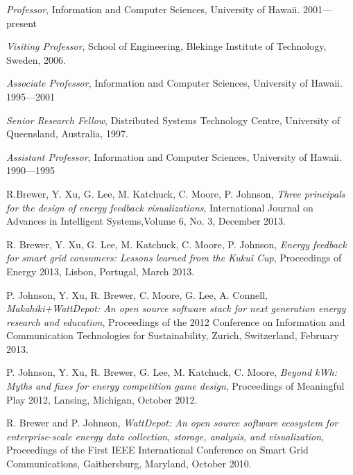 \begin{Appointments}
\item {\em Professor},  Information and Computer
  Sciences, University of Hawaii.  2001---present

\item {\em Visiting Professor}, School of Engineering, Blekinge Institute of Technology, Sweden, 2006.

\item {\em Associate Professor},  Information and Computer
  Sciences, University of Hawaii.  1995---2001

\item {\em Senior Research Fellow},  Distributed Systems Technology Centre,
University of Queensland, Australia, 1997.

\item {\em Assistant Professor},   Information and Computer
  Sciences, University of Hawaii.  1990---1995

\end{Appointments}




\begin{Publications: Closely Related}

\item R.Brewer, Y. Xu, G. Lee, M. Katchuck, C. Moore, P. Johnson, {\em Three principals for the design of energy feedback visualizations}, International Journal on Advances in Intelligent Systems,Volume 6, No. 3, December 2013.


\item R. Brewer, Y. Xu, G. Lee, M. Katchuck, C. Moore, P. Johnson, {\em Energy feedback for smart grid consumers: Lessons learned from the Kukui Cup}, Proceedings of Energy 2013, Lisbon, Portugal, March 2013.


\item P. Johnson, Y. Xu, R. Brewer,  C. Moore,  G. Lee, A. Connell, {\em Makahiki+WattDepot: An open source software stack for next generation energy research and education}, Proceedings of the 2012 Conference on Information and Communication Technologies for Sustainability, Zurich, Switzerland, February 2013.

\item P. Johnson, Y. Xu, R. Brewer, G. Lee, M. Katchuck, C. Moore, {\em Beyond kWh: Myths and fixes for energy competition game design}, Proceedings of Meaningful Play 2012, Lansing, Michigan, October 2012.

\item R. Brewer and P. Johnson, {\em WattDepot: An open source software ecosystem for enterprise-scale energy data collection, storage, analysis, and visualization}, Proceedings of the First IEEE International Conference on Smart Grid Communications, Gaithersburg, Maryland, October 2010.


\end{Publications: Closely Related}


